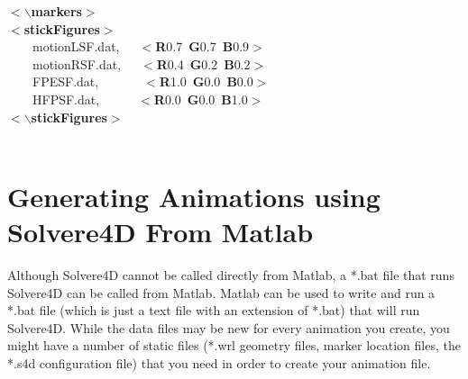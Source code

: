 \documentclass[singlecolumn,12pt]{article}
\newcommand{\hlstd}[1]{\textcolor[rgb]{0,0,0}{#1}}
\newcommand{\hlkey}[1]{\textcolor[rgb]{0,0,1}{\bf{#1}}}
\newcommand{\hlnum}[1]{\textcolor[rgb]{0.66,0,0.66}{#1}}
\begin{document}
\begin{landscape}
{}\hlkey{$<$$\backslash$markers$>$}\hlstd{\\
}\hlkey{$<$stickFigures$>$}\hlstd{\\
\hlstd{\ \ \ \ }motionL\textunderscore SF.dat,\hlstd{\ \ \ }}\hlkey{$<$R}\hlnum{0.7\ }\hlkey{G}\hlnum{0.7\ }\hlkey{B}\hlnum{0.9}\hlkey{$>$}\hlstd{\\
\hlstd{\ \ \ \ }motionR\textunderscore SF.dat,\hlstd{\ \ \ }}\hlkey{$<$R}\hlnum{0.4\ }\hlkey{G}\hlnum{0.2\ }\hlkey{B}\hlnum{0.2}\hlkey{$>$}\hlstd{\\
\hlstd{\ \ \ \ }FPE\textunderscore SF.dat,\hlstd{\ \ \ \ \ \ \ }}\hlkey{$<$R}\hlnum{1.0\ }\hlkey{G}\hlnum{0.0\ }\hlkey{B}\hlnum{0.0}\hlkey{$>$}\hlstd{\\
\hlstd{\ \ \ \ }HFP\textunderscore SF.dat,\hlstd{\ \ \ \ \ \ }}\hlkey{$<$R}\hlnum{0.0\ }\hlkey{G}\hlnum{0.0\ }\hlkey{B}\hlnum{1.0}\hlkey{$>$}\hlstd{\\
}\hlkey{$<$$\backslash$stickFigures$>$}\hlstd{}\mbox{}\\
\mbox{}\\
\normalfont
\end{landscape}

\section{Generating Animations using Solvere4D From Matlab}

\label{app_matlab}

Although Solvere4D cannot be called directly from Matlab, a *.bat
file that runs Solvere4D can be called from Matlab. Matlab can be
used to write and run a *.bat file (which is just a text file with
an extension of *.bat) that will run Solvere4D. While the data files
may be new for every animation you create, you might have a number
of static files (*.wrl geometry files, marker location files, the
*.s4d configuration file) that you need in order to create your
animation file.
\end{document}
